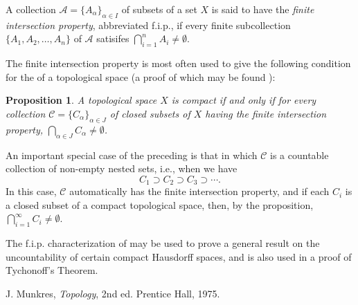 \documentclass[12pt]{article}
\theoremstyle{plain}
\newtheorem*{proposition*}{Proposition}
\newcommand{\set}[1]{\{#1\}}
\begin{document}
A collection $\mathcal{A}=\set{A_\alpha}_{\alpha\in I}$ of subsets of a set $X$ is said to have the \emph{finite intersection property}, abbreviated f.i.p., if every finite subcollection $\set{A_1,A_2,\ldots,A_n}$ of $\mathcal{A}$ satisifes $\bigcap_{i=1}^nA_i\neq\emptyset$. 

The finite intersection property is most often used to give the following  condition for the  of a topological space (a proof of which may be found ):

\begin{proposition*}
A topological space $X$ is compact if and only if for every collection $\mathcal{C}=\set{C_\alpha}_{\alpha\in J}$ of closed subsets of $X$ having the finite intersection property, $\bigcap_{\alpha\in J}C_\alpha\neq\emptyset$.
\end{proposition*}

An important special case of the preceding  is that in which $\mathcal{C}$ is a countable collection of non-empty nested sets, i.e., when we have
\begin{equation*}
C_1\supset C_2\supset C_3\supset\cdots\text{.}
\end{equation*}
In this case, $\mathcal{C}$ automatically has the finite intersection property, and if each $C_i$ is a closed subset of a compact topological space, then, by the proposition, $\bigcap_{i=1}^\infty C_i\neq\emptyset$.

The f.i.p. characterization of  may be used to prove a general result on the uncountability of certain compact Hausdorff spaces, and is also used in a proof of Tychonoff's Theorem.


\begin{thebibliography}{1}
J. Munkres, \emph{Topology}, 2nd ed. Prentice Hall, 1975.
\end{thebibliography}


 
\end{document}
